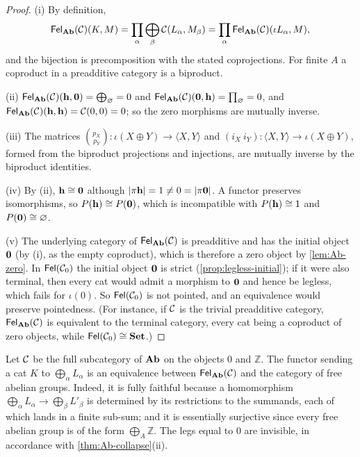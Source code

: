 \begin{proof}
(i) By definition,
\[
\mathsf{Fel}_{\mathbf{Ab}}(\mathcal{C})(K,M)=\prod_\alpha\bigoplus_\beta\mathcal{C}(L_\alpha,M_\beta)=\prod_\alpha\mathsf{Fel}_{\mathbf{Ab}}(\mathcal{C})(\iota L_\alpha,M),
\]
and the bijection is precomposition with the stated coprojections. For finite
$A$ a coproduct in a preadditive category is a biproduct.

(ii) $\mathsf{Fel}_{\mathbf{Ab}}(\mathcal{C})(\mathbf{h},\mathbf{0})=\bigoplus_{\varnothing}=0$ and
$\mathsf{Fel}_{\mathbf{Ab}}(\mathcal{C})(\mathbf{0},\mathbf{h})=\prod_\varnothing=0$, and
$\mathsf{Fel}_{\mathbf{Ab}}(\mathcal{C})(\mathbf{h},\mathbf{h})=\mathcal{C}(0,0)=0$; so the zero morphisms are mutually
inverse.

(iii) The matrices $\binom{p_X}{p_Y}\colon\iota(X\oplus Y)\to\langle X,Y\rangle$
and $(i_X\ i_Y)\colon\langle X,Y\rangle\to\iota(X\oplus Y)$, formed from the
biproduct projections and injections, are mutually inverse by the biproduct
identities.

(iv) By (ii), $\mathbf{h}\cong\mathbf{0}$ although $|\pi\mathbf{h}|=1\neq0=|\pi\mathbf{0}|$.
A functor preserves isomorphisms, so $P(\mathbf{h})\cong P(\mathbf{0})$, which is
incompatible with $P(\mathbf{h})\cong1$ and $P(\mathbf{0})\cong\varnothing$.

(v) The underlying category of $\mathsf{Fel}_{\mathbf{Ab}}(\mathcal{C})$ is preadditive and has the
initial object $\mathbf{0}$ (by (i), as the empty coproduct), which is therefore a
zero object by \cref{lem:Ab-zero}. In $\mathsf{Fel}(\mathcal{C}_0)$ the initial object
$\mathbf{0}$ is strict (\cref{prop:legless-initial}); if it were also terminal,
then every cat would admit a morphism to $\mathbf{0}$ and hence be legless,
which fails for $\iota(0)$. So $\mathsf{Fel}(\mathcal{C}_0)$ is not pointed, and an equivalence
would preserve pointedness. (For instance, if $\mathcal{C}$ is the trivial preadditive
category, $\mathsf{Fel}_{\mathbf{Ab}}(\mathcal{C})$ is equivalent to the terminal category, every cat
being a coproduct of zero objects, while $\mathsf{Fel}(\mathcal{C}_0)\cong\mathbf{Set}$.)
\end{proof}

\begin{example}\label{ex:free-abelian}
Let $\mathcal{C}$ be the full subcategory of $\mathbf{Ab}$ on the objects $0$ and $\mathbb Z$. The
functor sending a cat $K$ to $\bigoplus_\alpha L_\alpha$ is an equivalence
between $\mathsf{Fel}_{\mathbf{Ab}}(\mathcal{C})$ and the category of free abelian groups. Indeed, it is
fully faithful because a homomorphism
$\bigoplus_{\alpha}L_\alpha\to\bigoplus_\beta L'_\beta$ is determined by its
restrictions to the summands, each of which lands in a finite sub-sum; and it
is essentially surjective since every free abelian group is of the form
$\bigoplus_A\mathbb Z$. The legs equal to $0$ are invisible, in accordance with
\cref{thm:Ab-collapse}(ii).
\end{example}

